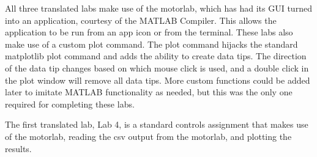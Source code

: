 All three translated labs make use of the motorlab, which has had its GUI turned into an application, courtesy of the MATLAB
Compiler. This allows the application to be run from an app icon or from the terminal. These labs also make use of a custom plot
command. The plot command hijacks the standard matplotlib plot command and adds the ability to create data tips. The
direction of the data tip changes based on which mouse click is used, and a double click in the plot window will remove all data tips.
More custom functions could be added later to imitate MATLAB functionality as needed, but this was the only one required for
completing these labs.

The first translated lab, Lab 4, is a standard controls assignment that makes use of the motorlab, reading the csv output from the
motorlab, and plotting the results. 

\label{control_assignment_1}

